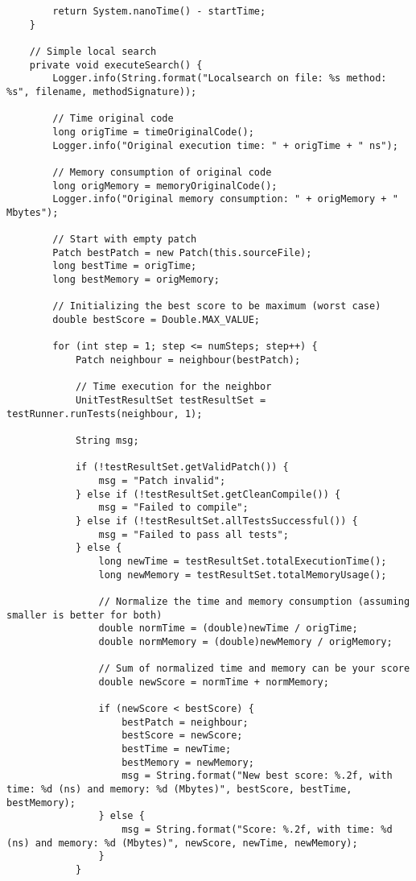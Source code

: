 \begin{lstlisting}
        return System.nanoTime() - startTime;
    }

    // Simple local search
    private void executeSearch() {
        Logger.info(String.format("Localsearch on file: %s method: %s", filename, methodSignature));

        // Time original code
        long origTime = timeOriginalCode();
        Logger.info("Original execution time: " + origTime + " ns");

        // Memory consumption of original code
        long origMemory = memoryOriginalCode();
        Logger.info("Original memory consumption: " + origMemory + " Mbytes");

        // Start with empty patch
        Patch bestPatch = new Patch(this.sourceFile);
        long bestTime = origTime;
        long bestMemory = origMemory;
        
        // Initializing the best score to be maximum (worst case)
        double bestScore = Double.MAX_VALUE;
        
        for (int step = 1; step <= numSteps; step++) {
            Patch neighbour = neighbour(bestPatch);

            // Time execution for the neighbor
            UnitTestResultSet testResultSet = testRunner.runTests(neighbour, 1);

            String msg;

            if (!testResultSet.getValidPatch()) {
                msg = "Patch invalid";
            } else if (!testResultSet.getCleanCompile()) {
                msg = "Failed to compile";
            } else if (!testResultSet.allTestsSuccessful()) {
                msg = "Failed to pass all tests";
            } else {
                long newTime = testResultSet.totalExecutionTime();
                long newMemory = testResultSet.totalMemoryUsage();
                
                // Normalize the time and memory consumption (assuming smaller is better for both)
                double normTime = (double)newTime / origTime;
                double normMemory = (double)newMemory / origMemory;
                
                // Sum of normalized time and memory can be your score
                double newScore = normTime + normMemory;

                if (newScore < bestScore) {
                    bestPatch = neighbour;
                    bestScore = newScore;
                    bestTime = newTime;
                    bestMemory = newMemory;
                    msg = String.format("New best score: %.2f, with time: %d (ns) and memory: %d (Mbytes)", bestScore, bestTime, bestMemory);
                } else {
                    msg = String.format("Score: %.2f, with time: %d (ns) and memory: %d (Mbytes)", newScore, newTime, newMemory);
                }
            }


\end{lstlisting}
